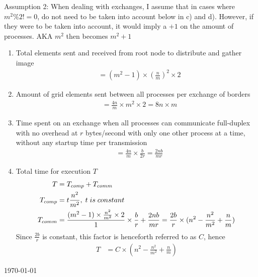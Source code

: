 \documentclass[fontsize=11pt, paper=a4, titlepage]{article}
\begin{document}
Assumption 2: When dealing with exchanges, I assume that in cases where $m^2 \%
2 != 0$, do not need to be taken into account below in c) and d). However, if
they were to be taken into account, it would imply a $+1$ on the amount of
processes. AKA $m^2$ then becomes $m^2 +1$

\begin{enumerate}

    \item Total elements sent and received from root node to distribute and gather image
    \begin{align*}
        &= (m^2 - 1)\times (\frac{n}{m})^2\times 2
    \end{align*}

    \item Amount of grid elements sent between all processes per exchange of borders
    \begin{align*}
        &= \frac{4n}{m}\times m^2\times 2 = 8n\times m
    \end{align*}

    \item Time spent on an exchange when all processes can communicate full-duplex
with no overhead at $r$ bytes/second with only one other process at a time, without any startup time per transmission
    \begin{align*}
        &= \frac{4n}{m}\times \frac{b}{2r} = \frac{2nb}{mr}
    \end{align*}


    \item Total time for execution $T$
    \begin{align*}
        T &= T_{comp} + T_{comm} \\
        T_{comp} &= t \frac{n^2}{m^2},\thickspace t\thickspace is\thickspace constant \\
        T_{comm} &= \frac{(m^2 -1)\times \frac{n^2}{m^2}\times 2}{1}\times \frac{b}{r} +  \frac{2nb}{mr} = \frac{2b}{r}\times (n^2 - \frac{n^2}{m^2} + \frac{n}{m})
    \end{align*}
    Since $\frac{2b}{r}$ is constant, this factor is henceforth referred to as $C$, hence
    \begin{align*}
        T &= C \times (n^2 - \frac{n^2}{m^2} + \frac{n}{m})
    \end{align*}

\end{enumerate}

\vfill
\large{\today}
\end{document}
